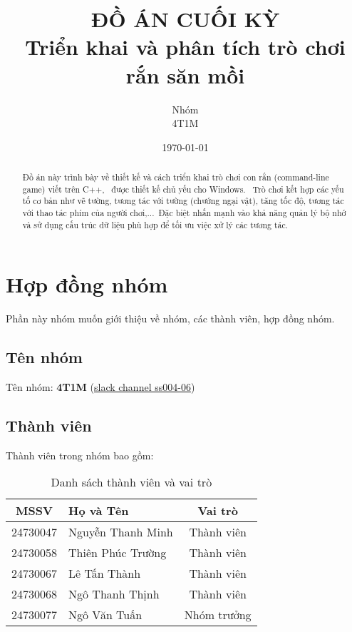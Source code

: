 \documentclass[12pt]{report}
\title{ĐỒ ÁN CUỐI KỲ \\ Triển khai và phân tích trò chơi rắn săn mồi}
\author{Nhóm \\ 4T1M}
\date{\today}
\begin{document}
\maketitle

\begin{abstract}
    Đồ án này trình bày về thiết kế và cách triển khai trò chơi con rắn (command-line game) viết trên C++, \
    được thiết kế chủ yếu cho Windows. \
    Trò chơi kết hợp các yếu tố cơ bản như vẽ tường, tương tác với tường (chướng ngại vật), tăng tốc độ, tương tác với thao tác phím của người chơi,...\
    Đặc biệt nhấn mạnh vào khả năng quản lý bộ nhớ và sử dụng cấu trúc dữ liệu phù hợp để tối ưu việc xử lý các tương tác.
\end{abstract}

\tableofcontents

\chapter{Hợp đồng nhóm}
\label{sec:group_contract}
Phần này nhóm muốn giới thiệu về nhóm, các thành viên, hợp đồng nhóm.

\section{Tên nhóm}
Tên nhóm: \textbf{4T1M} (\href{https://ss004e11cn1.slack.com/archives/C07T94K918U}{slack channel ss004-06})

\section{Thành viên}
Thành viên trong nhóm bao gồm:
\begin{table}[h!]
    \centering
    \begin{tabular}{|c|l|c|}
        \hline
        \rule{0pt}{13pt} \textbf{MSSV}      &
        \rule{0pt}{13pt} \textbf{Họ và Tên} &
        \rule{0pt}{13pt} \textbf{Vai trò}                                     \\
        \hline
        24730047                            & Nguyễn Thanh Minh & Thành viên  \\
        24730058                            & Thiên Phúc Trường & Thành viên  \\
        24730067                            & Lê Tấn Thành      & Thành viên  \\
        24730068                            & Ngô Thanh Thịnh   & Thành viên  \\
        24730077                            & Ngô Văn Tuấn      & Nhóm trưởng \\
        \hline
    \end{tabular}
    \caption{Danh sách thành viên và vai trò}
    \label{tab:group_members}
\end{table}
\end{document}
